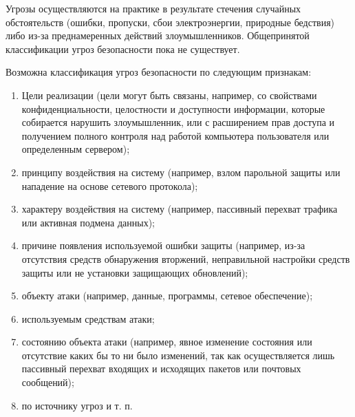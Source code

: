 Угрозы осуществляются на практике в результате стечения случайных обстоятельств
(ошибки, пропуски, сбои электроэнергии, природные бедствия) либо из-за
преднамеренных действий злоумышленников. Общепринятой классификации угроз
безопасности пока не существует.

Возможна классификация угроз безопасности по следующим признакам:
\begin{enumerate}
  \item Цели реализации (цели могут быть связаны, например, со свойствами
  конфиденциальности, целостности и доступности информации, которые собирается
  нарушить злоумышленник, или с расширением прав доступа и получением полного
  контроля над работой компьютера пользователя или определенным сервером);
  \item принципу воздействия на систему (например, взлом парольной защиты или
  нападение на основе сетевого протокола);
  \item характеру воздействия на систему (например, пассивный перехват трафика
  или активная подмена данных);
  \item причине появления используемой ошибки защиты (например, из-за отсутствия
  средств обнаружения вторжений, неправильной настройки средств защиты или не
  установки защищающих обновлений);
  \item объекту атаки (например, данные, программы, сетевое обеспечение);
  \item используемым средствам атаки;
  \item состоянию объекта атаки (например, явное изменение состояния или
  отсутствие каких бы то ни было изменений, так как осуществляется лишь
  пассивный перехват входящих и исходящих пакетов или почтовых сообщений);
  \item по источнику угроз и т. п.
\end{enumerate}


